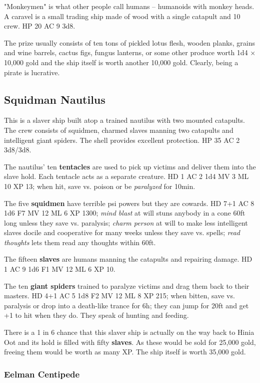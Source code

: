 \documentclass[11pt]{bxart}
\begin{document}
"Monkeymen" is what other people call humans – humanoids with monkey heads. A caravel is a small trading ship made of wood with a single catapult and 10 crew. HP 20 AC 9 3d8.

The prize usually consists of ten tons of pickled lotus flesh, wooden planks, grains and wine barrels, cactus figs, fungus lanterns, or some other produce worth 1d4 × 10,000 gold and the ship itself is worth another 10,000 gold. Clearly, being a pirate is lucrative.

\subsection{Squidman Nautilus}

This is a slaver ship built atop a trained nautilus with two mounted catapults. The crew consists of squidmen, charmed slaves manning two catapults and intelligent giant spiders. The shell provides excellent protection. HP 35 AC 2 3d8/3d8.

The nautilus' ten \textbf{tentacles} are used to pick up victims and deliver them into the slave hold. Each tentacle acts as a separate creature. HD 1 AC 2 1d4 MV 3 ML 10 XP 13; when hit, save vs. poison or be \textit{paralyzed} for 10min.

The five \textbf{squidmen} have terrible psi powers but they are cowards. HD 7+1 AC 8 1d6 F7 MV 12 ML 6 XP 1300; \textit{mind blast} at will stuns anybody in a cone 60ft long unless they save vs. paralysis; \textit{charm person} at will to make less intelligent slaves docile and cooperative for many weeks unless they save vs. spells; \textit{read thoughts} lets them read any thoughts within 60ft.

The fifteen \textbf{slaves} are humans manning the catapults and repairing damage. HD 1 AC 9 1d6 F1 MV 12 ML 6 XP 10.

The ten \textbf{giant spiders} trained to paralyze victims and drag them back to their masters. HD 4+1 AC 5 1d8 F2 MV 12 ML 8 XP 215; when bitten, save vs. paralysis or drop into a death-like trance for 6h; they can jump for 20ft and get +1 to hit when they do. They speak of hunting and feeding.

There is a 1 in 6 chance that this slaver ship is actually on the way back to Hinia Oot and its hold is filled with fifty \textbf{slaves}. As these would be sold for 25,000 gold, freeing them would be worth as many XP. The ship itself is worth 35,000 gold.

\subsubsection{Eelman Centipede}
\end{document}
